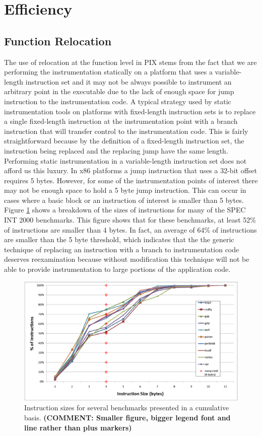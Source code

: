 \section{Efficiency}

\subsection{Function Relocation}
The use of relocation at the function level in PIX stems from the fact
that we are performing the instrumentation statically on a platform that uses a
variable-length instruction set and it may not be always possible to instrument
an arbitrary point in the executable due to the lack of enough space for jump instruction to the instrumentation code. 
A typical strategy used by static
instrumentation tools on platforms with fixed-length instruction sets is to
replace a single fixed-length instruction at the instrumentation point with a
branch instruction that will transfer control to the instrumentation code. This is fairly straightforward because by the
definition of a fixed-length instruction set, the instruction being replaced and
the replacing jump have the same length. Performing static instrumentation
in a variable-length instruction set does not afford us this luxury. In x86 platforms a
jump instruction that uses a 32-bit offset requires 5 bytes. However, for some of
the instrumentation points of interest there may not be enough space to hold a 5 byte
jump instruction. This can occur in cases where a basic block or an instruction of interest
is smaller than 5 bytes. Figure \ref{Figure:InstructionSizes} shows a breakdown of the sizes of
instructions for many of the SPEC INT 2000 benchmarks. This figure shows that for these benchmarks,
at least 52\% of instructions are smaller than 4 bytes. In fact, an average of 64\% of instructions
are smaller than the 5 byte threshold, which indicates that the the generic technique of replacing 
an instruction with a branch to instrumentation code deserves reexamination because without modification
this technique will not be able to provide instrumentation to large portions of the application code.

\begin{figure}[ht]
\centering
\label{Figure:InstructionSizes}
\includegraphics[scale=0.4]{instsize.eps}
\caption{Instruction sizes for several benchmarks presented in a cumulative basis. \textbf{(COMMENT: Smaller figure, bigger legend font and line rather than plus markers)}}
\end{figure}

